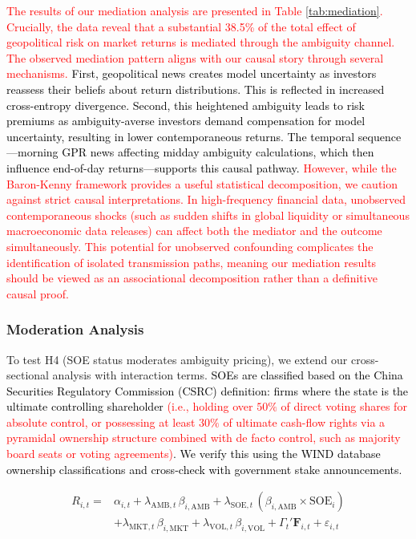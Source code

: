 \documentclass[preprint,12pt,authoryear]{elsarticle}
\begin{document}
\textcolor{black}{\textcolor{red}{The results of our mediation analysis are presented in Table \ref{tab:mediation}. Crucially, the data reveal that a substantial 38.5\% of the total effect of geopolitical risk on market returns is mediated through the ambiguity channel. The observed mediation pattern aligns with our causal story through several mechanisms.} First, geopolitical news creates model uncertainty as investors reassess their beliefs about return distributions. This is reflected in increased cross-entropy divergence. Second, this heightened ambiguity leads to risk premiums as ambiguity-averse investors demand compensation for model uncertainty, resulting in lower contemporaneous returns. The temporal sequence---morning GPR news affecting midday ambiguity calculations, which then influence end-of-day returns---supports this causal pathway.} \textcolor{red}{However, while the Baron-Kenny framework provides a useful statistical decomposition, we caution against strict causal interpretations. In high-frequency financial data, unobserved contemporaneous shocks (such as sudden shifts in global liquidity or simultaneous macroeconomic data releases) can affect both the mediator and the outcome simultaneously. This potential for unobserved confounding complicates the identification of isolated transmission paths, meaning our mediation results should be viewed as an associational decomposition rather than a definitive causal proof.}

\subsubsection{Moderation Analysis}

To test H4 (SOE status moderates ambiguity pricing), we extend our cross-sectional analysis with interaction terms. \textcolor{black}{SOEs are classified based on the China Securities Regulatory Commission (CSRC) definition: firms where the state is the ultimate controlling shareholder \textcolor{red}{(i.e., holding over $50\%$ of direct voting shares for absolute control, or possessing at least $30\%$ of ultimate cash-flow rights via a pyramidal ownership structure combined with de facto control, such as majority board seats or voting agreements)}. We verify this using the WIND database ownership classifications and cross-check with government stake announcements.}

\begin{equation}
\begin{split}
R_{i,t} = & \alpha_{i,t} + \lambda_{\text{AMB},t} \, \beta_{i,\text{AMB}} + \lambda_{\text{SOE},t} \, (\beta_{i,\text{AMB}} \times \text{SOE}_i) \\ 
&+ \lambda_{\text{MKT},t} \, \beta_{i,\text{MKT}} + \lambda_{\text{VOL},t} \, \beta_{i,\text{VOL}} + \Gamma_{t}' \mathbf{F}_{i,t} + \varepsilon_{i,t}
\end{split}
\end{equation}
\end{document}
